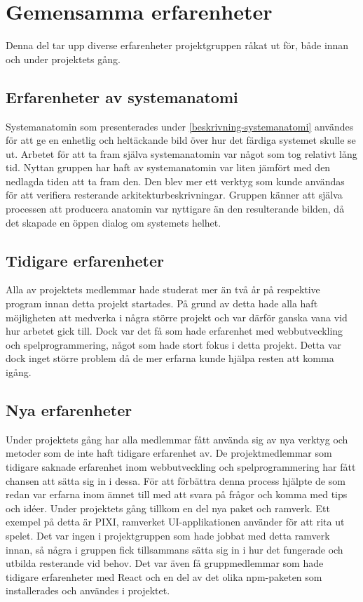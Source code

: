 
\section{Gemensamma erfarenheter}
Denna del tar upp diverse erfarenheter projektgruppen råkat ut för, både innan och under projektets gång.

\subsection{Erfarenheter av systemanatomi}
Systemanatomin som presenterades under \ref{beskrivning-systemanatomi} användes för att ge en enhetlig och heltäckande bild över hur det färdiga systemet skulle se ut. Arbetet för att ta fram själva systemanatomin var något som tog relativt lång tid. Nyttan gruppen har haft av systemanatomin var liten jämfört med den nedlagda tiden att ta fram den. Den blev mer ett verktyg som kunde användas för att verifiera resterande arkitekturbeskrivningar. Gruppen känner att själva processen att producera anatomin var nyttigare än den resulterande bilden, då det skapade en öppen dialog om systemets helhet.

\subsection{Tidigare erfarenheter}
Alla av projektets medlemmar hade studerat mer än två år på respektive program innan detta projekt startades. På grund av detta hade alla haft möjligheten att medverka i några större projekt och var därför ganska vana vid hur arbetet gick till. Dock var det få som hade erfarenhet med webbutveckling och spelprogrammering, något som hade stort fokus i detta projekt. Detta var dock inget större problem då de mer erfarna kunde hjälpa resten att komma igång.

\subsection{Nya erfarenheter}
Under projektets gång har alla medlemmar fått använda sig av nya verktyg och metoder som de inte haft tidigare erfarenhet av. De projektmedlemmar som tidigare saknade erfarenhet inom webbutveckling och spelprogrammering har fått chansen att sätta sig in i dessa. För att förbättra denna process hjälpte de som redan var erfarna inom ämnet till med att svara på frågor och komma med tips och idéer. Under projektets gång tillkom en del nya paket och ramverk. Ett exempel på detta är PIXI, ramverket UI-applikationen använder för att rita ut spelet. Det var ingen i projektgruppen som hade jobbat med detta ramverk innan, så några i gruppen fick tillsammans sätta sig in i hur det fungerade och utbilda resterande vid behov. Det var även få gruppmedlemmar som hade tidigare erfarenheter med React och en del av det olika npm-paketen som installerades och användes i projektet.

